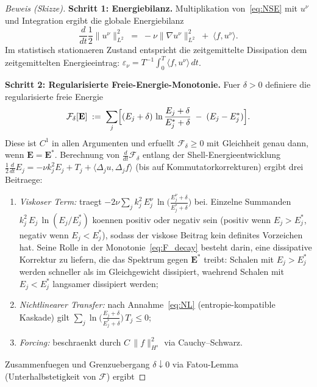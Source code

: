 \documentclass[12pt,a4paper]{article}
\theoremstyle{definition}
\theoremstyle{plain}
\theoremstyle{remark}
\begin{document}
\begin{proof}[Beweis (Skizze)]
\textbf{Schritt 1: Energiebilanz.}\;
Multiplikation von~\eqref{eq:NSE} mit $u^\nu$ und Integration ergibt die
globale Energiebilanz
\begin{equation}\label{eq:energy_balance}
  \frac{d}{dt}\frac{1}{2}\|u^\nu\|_{L^2}^2
  \;=\;
  -\nu\|\nabla u^\nu\|_{L^2}^2
  \;+\;
  \langle f, u^\nu \rangle.
\end{equation}
Im statistisch stationaeren Zustand entspricht die zeitgemittelte
Dissipation dem zeitgemittelten Energieeintrag:
$\varepsilon_\nu = T^{-1}\int_0^T \langle f, u^\nu \rangle\,dt$.

\textbf{Schritt 2: Regularisierte Freie-Energie-Monotonie.}\;
Fuer $\delta > 0$ definiere die regularisierte freie Energie
\[
  \mathcal{F}_\delta[\mathbf{E}]
  \;:=\;
  \sum_j \Bigl[
    (E_j + \delta)\,\ln\frac{E_j + \delta}{E_j^* + \delta}
    \;-\; (E_j - E_j^*)
  \Bigr].
\]
Diese ist $C^1$ in allen Argumenten und erfuellt $\mathcal{F}_\delta \ge 0$
mit Gleichheit genau dann, wenn $\mathbf{E} = \mathbf{E}^*$.
Berechnung von $\frac{d}{dt}\mathcal{F}_\delta$ entlang der
Shell-Energieentwicklung $\frac{1}{2}\frac{d}{dt}E_j = -\nu k_j^2 E_j + T_j
+ \langle \Delta_j u, \Delta_j f\rangle$ (bis auf Kommutatorkorrekturen)
ergibt drei Beitraege:
\begin{enumerate}
  \item \emph{Viskoser Term:} traegt
    $-2\nu \sum_j k_j^2\,E_j^\nu\,
    \ln\!\bigl(\frac{E_j^\nu+\delta}{E_j^*+\delta}\bigr)$
    bei. Einzelne Summanden $k_j^2\,E_j\,\ln(E_j/E_j^*)$ koennen
    positiv oder negativ sein (positiv wenn $E_j > E_j^*$, negativ wenn
    $E_j < E_j^*$), sodass der viskose Beitrag kein definites Vorzeichen
    hat. Seine Rolle in der Monotonie~\eqref{eq:F_decay} besteht darin,
    eine dissipative Korrektur zu liefern, die das Spektrum gegen
    $\mathbf{E}^*$ treibt: Schalen mit $E_j > E_j^*$ werden schneller
    als im Gleichgewicht dissipiert, waehrend Schalen mit $E_j < E_j^*$
    langsamer dissipiert werden;
  \item \emph{Nichtlinearer Transfer:} nach Annahme~\eqref{eq:NL}
    (entropie-kompatible Kaskade) gilt
    $\sum_j \ln\bigl(\frac{E_j+\delta}{E_j^*+\delta}\bigr)\,T_j
    \le 0$;
  \item \emph{Forcing:} beschraenkt durch $C\,\|f\|_{H^s}^2$ via
    Cauchy--Schwarz.
\end{enumerate}
Zusammenfuegen und Grenzuebergang $\delta \downarrow 0$ via Fatou-Lemma
(Unterhalbstetigkeit von $\mathcal{F}$) ergibt

\end{proof}
\end{document}
